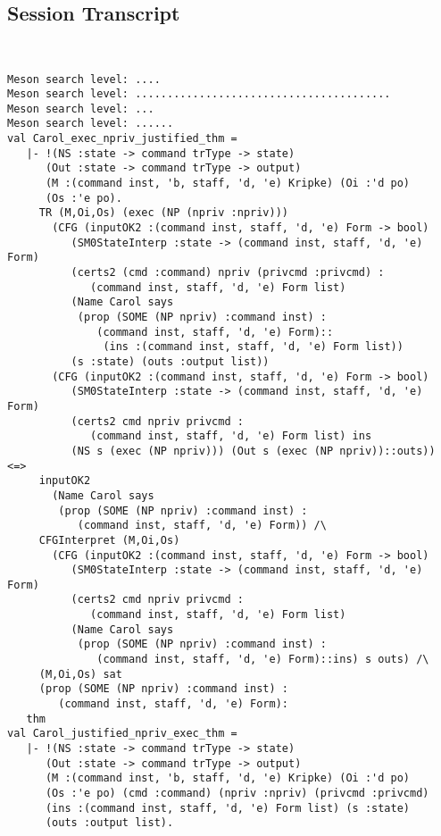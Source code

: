 \documentclass{report}
\begin{document}
\subsection{Session Transcript}
\label{trans6}
\begin{session}
  \begin{scriptsize}
\begin{verbatim}


Meson search level: ....
Meson search level: ........................................
Meson search level: ...
Meson search level: ......
val Carol_exec_npriv_justified_thm =
   |- !(NS :state -> command trType -> state)
      (Out :state -> command trType -> output)
      (M :(command inst, 'b, staff, 'd, 'e) Kripke) (Oi :'d po)
      (Os :'e po).
     TR (M,Oi,Os) (exec (NP (npriv :npriv)))
       (CFG (inputOK2 :(command inst, staff, 'd, 'e) Form -> bool)
          (SM0StateInterp :state -> (command inst, staff, 'd, 'e) Form)
          (certs2 (cmd :command) npriv (privcmd :privcmd) :
             (command inst, staff, 'd, 'e) Form list)
          (Name Carol says
           (prop (SOME (NP npriv) :command inst) :
              (command inst, staff, 'd, 'e) Form)::
               (ins :(command inst, staff, 'd, 'e) Form list))
          (s :state) (outs :output list))
       (CFG (inputOK2 :(command inst, staff, 'd, 'e) Form -> bool)
          (SM0StateInterp :state -> (command inst, staff, 'd, 'e) Form)
          (certs2 cmd npriv privcmd :
             (command inst, staff, 'd, 'e) Form list) ins
          (NS s (exec (NP npriv))) (Out s (exec (NP npriv))::outs)) <=>
     inputOK2
       (Name Carol says
        (prop (SOME (NP npriv) :command inst) :
           (command inst, staff, 'd, 'e) Form)) /\
     CFGInterpret (M,Oi,Os)
       (CFG (inputOK2 :(command inst, staff, 'd, 'e) Form -> bool)
          (SM0StateInterp :state -> (command inst, staff, 'd, 'e) Form)
          (certs2 cmd npriv privcmd :
             (command inst, staff, 'd, 'e) Form list)
          (Name Carol says
           (prop (SOME (NP npriv) :command inst) :
              (command inst, staff, 'd, 'e) Form)::ins) s outs) /\
     (M,Oi,Os) sat
     (prop (SOME (NP npriv) :command inst) :
        (command inst, staff, 'd, 'e) Form):
   thm
val Carol_justified_npriv_exec_thm =
   |- !(NS :state -> command trType -> state)
      (Out :state -> command trType -> output)
      (M :(command inst, 'b, staff, 'd, 'e) Kripke) (Oi :'d po)
      (Os :'e po) (cmd :command) (npriv :npriv) (privcmd :privcmd)
      (ins :(command inst, staff, 'd, 'e) Form list) (s :state)
      (outs :output list).

\end{verbatim}
\end{scriptsize}
\end{session}
\end{document}
